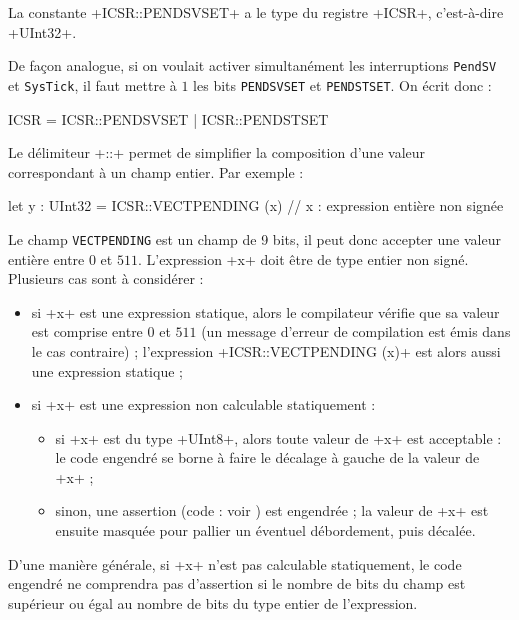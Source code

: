 La constante \plm+ICSR::PENDSVSET+ a le type du registre \plm+ICSR+, c'est-à-dire \plm+UInt32+.

De façon analogue, si on voulait activer simultanément les interruptions \texttt{PendSV} et \texttt{SysTick}, il faut mettre à $1$ les bits \texttt{PENDSVSET} et \texttt{PENDSTSET}. On écrit donc :
\begin{PLM}
ICSR = ICSR::PENDSVSET | ICSR::PENDSTSET
\end{PLM}







Le délimiteur \plm+::+ permet de simplifier la composition d'une valeur correspondant à un champ entier. Par exemple :

\begin{PLM}
let y : UInt32 = ICSR::VECTPENDING (x) // x : expression entière non signée
\end{PLM}

Le champ \texttt{VECTPENDING} est un champ de 9 bits, il peut donc accepter une valeur entière entre $0$ et $511$. L'expression \plm+x+ doit être de type entier non signé. Plusieurs cas sont à considérer :
\begin{itemize}
\item si \plm+x+ est une expression statique, alors le compilateur vérifie que sa valeur est comprise entre $0$ et $511$ (un message d'erreur de compilation est émis dans le cas contraire) ; l'expression \plm+ICSR::VECTPENDING (x)+ est alors aussi une expression statique ;
\item si \plm+x+ est une expression non calculable statiquement :
  \begin{itemize}
  \item si \plm+x+ est du type \plm+UInt8+, alors toute valeur de \plm+x+ est acceptable : le code engendré se borne à faire le décalage à gauche de la valeur de \plm+x+ ;
  \item sinon, une assertion (code : voir ) est engendrée ; la valeur de \plm+x+ est ensuite masquée pour pallier un éventuel débordement, puis décalée. 
  \end{itemize}
\end{itemize}

D'une manière générale, si \plm+x+ n'est pas calculable statiquement, le code engendré ne comprendra pas d'assertion si le nombre de bits du champ est supérieur ou égal au nombre de bits du type entier de l'expression.





